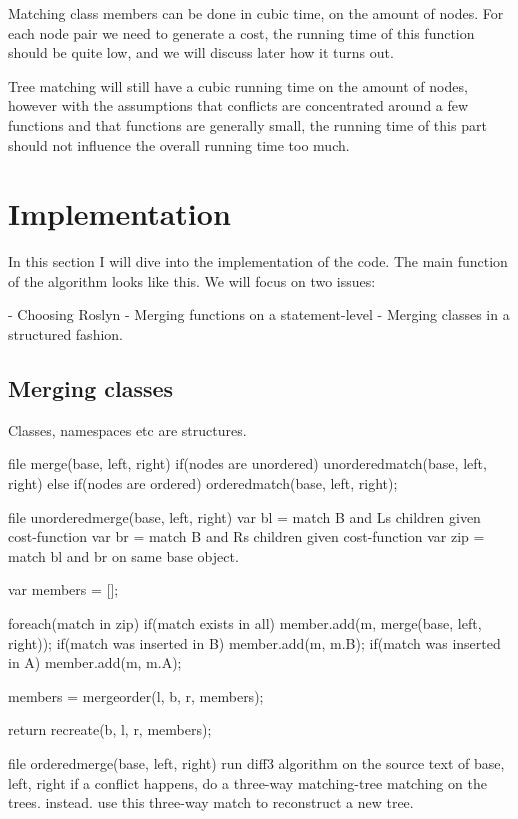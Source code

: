 \documentclass[11pt]{article}
\begin{document}
Matching class members can be done in cubic time, on the amount of nodes. For each node pair we need to generate a cost, the running time of this function should be quite low, and we will discuss later how it turns out. 

Tree matching will still have a cubic running time on the amount of nodes, however with the assumptions that conflicts are concentrated around a few functions and that functions are generally small, the running time of this part should not influence the overall running time too much.

\clearpage

\section{Implementation}
In this section I will dive into the implementation of the code. The main function of the algorithm looks like this. We will focus on two issues:



- Choosing Roslyn
- Merging functions on a statement-level
- Merging classes in a structured fashion.


\subsection{Merging classes}
Classes, namespaces etc are structures.

file merge(base, left, right)
    if(nodes are unordered)
        unorderedmatch(base, left, right)
    else if(nodes are ordered)
        orderedmatch(base, left, right);

file unorderedmerge(base, left, right)
    var bl = match B and Ls children given cost-function
    var br = match B and Rs children given cost-function
    var zip = match bl and br on same base object.

    var members = [];

    foreach(match in zip)
        if(match exists in all)
            member.add(m, merge(base, left, right));
        if(match was inserted in B)
            member.add(m, m.B);
        if(match was inserted in A)
            member.add(m, m.A);
    
    members = mergeorder(l, b, r, members);

    return recreate(b, l, r, members);
    

file orderedmerge(base, left, right)
    run diff3 algorithm on the source text of base, left, right
    if a conflict happens, do a three-way matching-tree matching on the trees. instead.
    use this three-way match to reconstruct a new tree.
\end{document}
